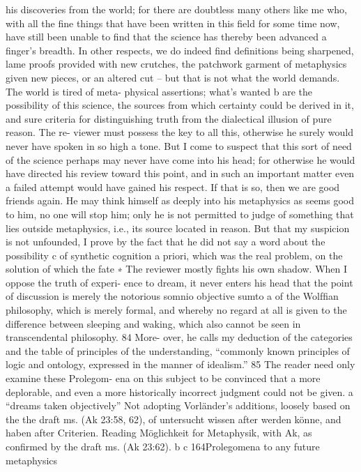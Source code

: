 his discoveries from the world; for there are doubtless many others like
me who, with all the ﬁne things that have been written in this ﬁeld for
some time now, have still been unable to ﬁnd that the science has thereby
been advanced a ﬁnger’s breadth. In other respects, we do indeed ﬁnd
deﬁnitions being sharpened, lame proofs provided with new crutches,
the patchwork garment of metaphysics given new pieces, or an altered
cut – but that is not what the world demands. The world is tired of meta-
physical assertions; what’s wanted b are the possibility of this science, the
sources from which certainty could be derived in it, and sure criteria for
distinguishing truth from the dialectical illusion of pure reason. The re-
viewer must possess the key to all this, otherwise he surely would never
have spoken in so high a tone.
But I come to suspect that this sort of need of the science perhaps may
never have come into his head; for otherwise he would have directed his
review toward this point, and in such an important matter even a failed
attempt would have gained his respect. If that is so, then we are good
friends again. He may think himself as deeply into his metaphysics as
seems good to him, no one will stop him; only he is not permitted to
judge of something that lies outside metaphysics, i.e., its source located
in reason. But that my suspicion is not unfounded, I prove by the fact
that he did not say a word about the possibility c of synthetic cognition
a priori, which was the real problem, on the solution of which the fate
∗ The reviewer mostly ﬁghts his own shadow. When I oppose the truth of experi-
ence to dream, it never enters his head that the point of discussion is merely the
notorious somnio objective sumto a of the Wolfﬁan philosophy, which is merely
formal, and whereby no regard at all is given to the difference between sleeping
and waking, which also cannot be seen in transcendental philosophy. 84 More-
over, he calls my deduction of the categories and the table of principles of the
understanding, “commonly known principles of logic and ontology, expressed
in the manner of idealism.” 85 The reader need only examine these Prolegom-
ena on this subject to be convinced that a more deplorable, and even a more
historically incorrect judgment could not be given.
a “dreams taken objectively”
Not adopting Vorländer’s additions, loosely based on the the draft ms. (Ak 23:58, 62), of
untersucht wissen after werden könne, and haben after Criterien.
Reading Möglichkeit for Metaphysik, with Ak, as conﬁrmed by the draft ms. (Ak 23:62).
b
c
164Prolegomena to any future metaphysics
